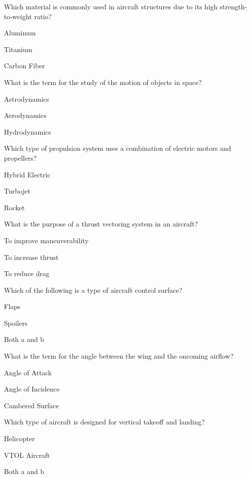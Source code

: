 \begin{enhancedmcq}{Which material is commonly used in aircraft structures due to its high strength-to-weight ratio?}
\item Aluminum
\item Titanium
\item Carbon Fiber

\end{enhancedmcq}
\begin{enhancedmcq}{What is the term for the study of the motion of objects in space?}
\item Astrodynamics
\item Aerodynamics
\item Hydrodynamics

\end{enhancedmcq}
\begin{enhancedmcq}{Which type of propulsion system uses a combination of electric motors and propellers?}
\item Hybrid Electric
\item Turbojet
\item Rocket

\end{enhancedmcq}
\begin{enhancedmcq}{What is the purpose of a thrust vectoring system in an aircraft?}
\item To improve maneuverability
\item To increase thrust
\item To reduce drag

\end{enhancedmcq}
\begin{enhancedmcq}{Which of the following is a type of aircraft control surface?}
\item Flaps
\item Spoilers
\item Both a and b

\end{enhancedmcq}
\begin{enhancedmcq}{What is the term for the angle between the wing and the oncoming airflow?}
\item Angle of Attack
\item Angle of Incidence
\item Cambered Surface

\end{enhancedmcq}
\begin{enhancedmcq}{Which type of aircraft is designed for vertical takeoff and landing?}
\item Helicopter
\item VTOL Aircraft
\item Both a and b

\end{enhancedmcq}
